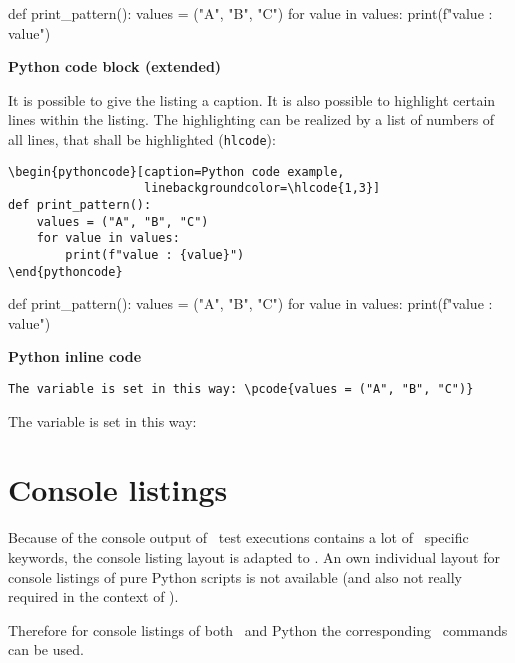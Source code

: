 \documentclass[a4paper,10pt]{report}
\begin{document}
\begin{pythoncode}
def print_pattern():
    values = ("A", "B", "C")
    for value in values:
        print(f"value : {value}")
\end{pythoncode}

\newpage

\textbf{Python code block (extended)}

It is possible to give the listing a caption. It is also possible to highlight certain lines within the listing. The highlighting can be realized by a list
of numbers of all lines, that shall be highlighted (\texttt{hlcode}):

\vspace{2ex}

\begin{verbatim}
\begin{pythoncode}[caption=Python code example, 
                   linebackgroundcolor=\hlcode{1,3}]
def print_pattern():
    values = ("A", "B", "C")
    for value in values:
        print(f"value : {value}")
\end{pythoncode}
\end{verbatim}

\begin{pythoncode}[caption=Python code example, 
                   linebackgroundcolor=\hlcode{1,3}]
def print_pattern():
    values = ("A", "B", "C")
    for value in values:
        print(f"value : {value}")
\end{pythoncode}

\vspace{2ex}

\textbf{Python inline code}
\begin{verbatim}
The variable is set in this way: \pcode{values = ("A", "B", "C")}
\end{verbatim}

The variable is set in this way: 

\section{Console listings}

Because of the console output of \rfw\ test executions contains a lot of \rfw\ specific keywords, the console listing layout is adapted to \rfw.
An own individual layout for console listings of pure Python scripts is not available (and also not really required in the context of \rfw).

Therefore for console listings of both \rfw\ and Python the corresponding \rfw\ commands can be used.
\end{document}
